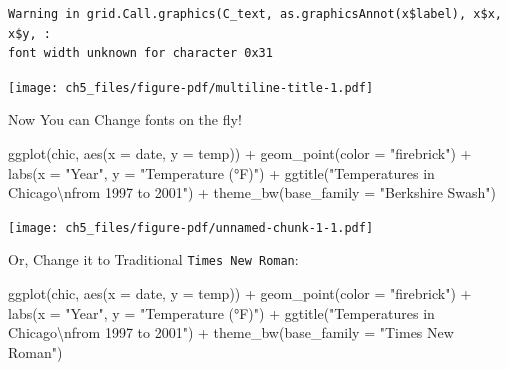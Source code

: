 \documentclass[
  letterpaper,
  DIV=11,
  numbers=noendperiod]{scrreprt}
\newenvironment{Shaded}{\begin{snugshade}}{\end{snugshade}}
\newcommand{\AttributeTok}[1]{\textcolor[rgb]{0.40,0.45,0.13}{#1}}
\newcommand{\FunctionTok}[1]{\textcolor[rgb]{0.28,0.35,0.67}{#1}}
\newcommand{\NormalTok}[1]{\textcolor[rgb]{0.00,0.23,0.31}{#1}}
\newcommand{\SpecialCharTok}[1]{\textcolor[rgb]{0.37,0.37,0.37}{#1}}
\newcommand{\StringTok}[1]{\textcolor[rgb]{0.13,0.47,0.30}{#1}}
\begin{document}
\begin{verbatim}
Warning in grid.Call.graphics(C_text, as.graphicsAnnot(x$label), x$x, x$y, :
font width unknown for character 0x31
\end{verbatim}

\texttt{[image: ch5\_files/figure-pdf/multiline-title-1.pdf]}

Now You can Change fonts on the fly!

\begin{Shaded}
\begin{Highlighting}[]
\FunctionTok{ggplot}\NormalTok{(chic, }\FunctionTok{aes}\NormalTok{(}\AttributeTok{x =}\NormalTok{ date, }\AttributeTok{y =}\NormalTok{ temp)) }\SpecialCharTok{+}
    \FunctionTok{geom\_point}\NormalTok{(}\AttributeTok{color =} \StringTok{"firebrick"}\NormalTok{) }\SpecialCharTok{+}
    \FunctionTok{labs}\NormalTok{(}\AttributeTok{x =} \StringTok{"Year"}\NormalTok{, }\AttributeTok{y =} \StringTok{"Temperature (°F)"}\NormalTok{) }\SpecialCharTok{+}
    \FunctionTok{ggtitle}\NormalTok{(}\StringTok{"Temperatures in Chicago}\SpecialCharTok{\textbackslash{}n}\StringTok{from 1997 to 2001"}\NormalTok{) }\SpecialCharTok{+}
    \FunctionTok{theme\_bw}\NormalTok{(}\AttributeTok{base\_family =} \StringTok{"Berkshire Swash"}\NormalTok{)}
\end{Highlighting}
\end{Shaded}

\texttt{[image: ch5\_files/figure-pdf/unnamed-chunk-1-1.pdf]}

Or, Change it to Traditional \texttt{Times\ New\ Roman}:

\begin{Shaded}
\begin{Highlighting}[]
\FunctionTok{ggplot}\NormalTok{(chic, }\FunctionTok{aes}\NormalTok{(}\AttributeTok{x =}\NormalTok{ date, }\AttributeTok{y =}\NormalTok{ temp)) }\SpecialCharTok{+}
    \FunctionTok{geom\_point}\NormalTok{(}\AttributeTok{color =} \StringTok{"firebrick"}\NormalTok{) }\SpecialCharTok{+}
    \FunctionTok{labs}\NormalTok{(}\AttributeTok{x =} \StringTok{"Year"}\NormalTok{, }\AttributeTok{y =} \StringTok{"Temperature (°F)"}\NormalTok{) }\SpecialCharTok{+}
    \FunctionTok{ggtitle}\NormalTok{(}\StringTok{"Temperatures in Chicago}\SpecialCharTok{\textbackslash{}n}\StringTok{from 1997 to 2001"}\NormalTok{) }\SpecialCharTok{+}
    \FunctionTok{theme\_bw}\NormalTok{(}\AttributeTok{base\_family =} \StringTok{"Times New Roman"}\NormalTok{)}
\end{Highlighting}
\end{Shaded}
\end{document}
